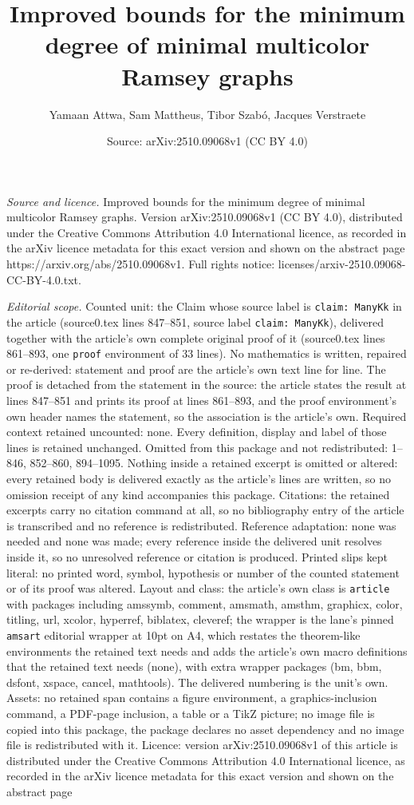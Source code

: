 \documentclass[10pt,a4paper]{amsart}
\title[Improved bounds for the minimum degree of minimal multicolor]{Improved bounds for the minimum degree of minimal multicolor Ramsey graphs}
\author{Yamaan Attwa, Sam Mattheus, Tibor Szab\'o, Jacques Verstraete}
\date{Source: arXiv:2510.09068v1 (CC BY 4.0)}
\begin{document}
\maketitle

\noindent\emph{Source and licence.} Improved bounds for the minimum degree of minimal multicolor Ramsey graphs. Version arXiv:2510.09068v1 (CC BY 4.0), distributed under the Creative Commons Attribution 4.0 International licence, as recorded in the arXiv licence metadata for this exact version and shown on the abstract page https://arxiv.org/abs/2510.09068v1. Full rights notice: licenses/arxiv-2510.09068-CC-BY-4.0.txt.\par\smallskip

\noindent\textit{Editorial scope.} Counted unit: the Claim whose source label is \texttt{claim: ManyKk} in the article (source0.tex lines 847--851, source label \texttt{claim: ManyKk}), delivered together with the article's own complete original proof of it (source0.tex lines 861--893, one \texttt{proof} environment of 33 lines). No mathematics is written, repaired or re-derived: statement and proof are the article's own text line for line. The proof is detached from the statement in the source: the article states the result at lines 847--851 and prints its proof at lines 861--893, and the proof environment's own header names the statement, so the association is the article's own. Required context retained uncounted: none. Every definition, display and label of those lines is retained unchanged. Omitted from this package and not redistributed: 1--846, 852--860, 894--1095. Nothing inside a retained excerpt is omitted or altered: every retained body is delivered exactly as the article's lines are written, so no omission receipt of any kind accompanies this package. Citations: the retained excerpts carry no citation command at all, so no bibliography entry of the article is transcribed and no reference is redistributed. Reference adaptation: none was needed and none was made; every reference inside the delivered unit resolves inside it, so no unresolved reference or citation is produced. Printed slips kept literal: no printed word, symbol, hypothesis or number of the counted statement or of its proof was altered. Layout and class: the article's own class is \texttt{article} with packages including amssymb, comment, amsmath, amsthm, graphicx, color, titling, url, xcolor, hyperref, biblatex, cleveref; the wrapper is the lane's pinned \texttt{amsart} editorial wrapper at 10pt on A4, which restates the theorem-like environments the retained text needs and adds the article's own macro definitions that the retained text needs (none), with extra wrapper packages (bm, bbm, dsfont, xspace, cancel, mathtools). The delivered numbering is the unit's own. Assets: no retained span contains a figure environment, a graphics-inclusion command, a PDF-page inclusion, a table or a TikZ picture; no image file is copied into this package, the package declares no asset dependency and no image file is redistributed with it. Licence: version arXiv:2510.09068v1 of this article is distributed under the Creative Commons Attribution 4.0 International licence, as recorded in the arXiv licence metadata for this exact version and shown on the abstract page 
\end{document}
